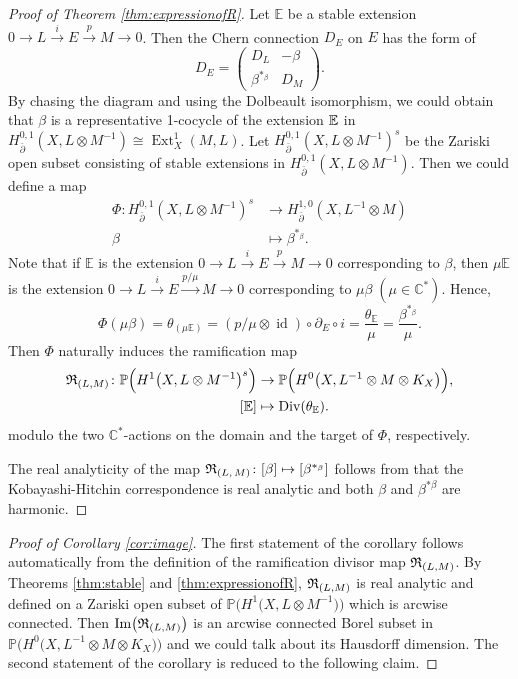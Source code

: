 \documentclass[12pt]{article}
\begin{document}
\begin{proof}[Proof of Theorem \ref{thm:expressionofR}]
Let $\mathbb{E}$ be a stable extension $0 \to L \xrightarrow{i} E \xrightarrow{p}  M \to 0$. Then the Chern connection $D_{E}$ on $E$ has the form of
\[ D_{E} = \begin{pmatrix}
D_{L} &  - \beta \\
  \beta^{*_{\beta}}     &D_{M}
\end{pmatrix}. \]
By chasing the diagram and using the Dolbeault isomorphism, %
we could obtain that $\beta$ is a representative 1-cocycle of the extension ${\Bbb E}$ in $H^{0,1}_{\bar{\partial}}(X, L \otimes M^{-1}) \cong \operatorname{Ext}_{X}^{1}(M, L)$. Let $H_{\bar{\partial}}^{0,1}(X, L \otimes M^{-1})^{s}$ be the Zariski open subset consisting of stable extensions in $H^{0,1}_{\bar{\partial}}(X, L \otimes M^{-1})$. Then we could define a map
\begin{align*}
\Phi \colon H_{\bar{\partial}}^{0,1}(X, L \otimes M^{-1})^{s} &\to H_{\bar{\partial}}^{1,0}(X, L^{-1} \otimes M) \\
  \beta &\mapsto \beta^{*_{\beta}}.
\end{align*}
Note that if $\mathbb{E}$ is the extension $0 \to L \xrightarrow{i} E \xrightarrow{p} M \to 0$ corresponding to $\beta$, then $\mu \mathbb{E}$ is the extension $0 \to L \xrightarrow{i} E \xrightarrow{p/\mu} M \to 0$ corresponding to $\mu \beta \; (\mu \in \mathbb{C}^{*})$. Hence,
\[ \Phi(\mu \beta) = \theta_{(\mu \mathbb E)} = (p/\mu \otimes \operatorname{id}) \circ \partial_{E} \circ i = \frac{\theta_{\mathbb E}}{\mu}  = \frac{\beta^{*_{\beta}}}{\mu}. \]
Then $\Phi$ naturally induces the ramification map
\begin{align*}
{\frak R}_{(L, M)}\colon \mathbb{P}\Big(H^{1}\big(X, L \otimes M^{-1}\big)^{s}\Big) &\rightarrow \mathbb{P}\Big(H^{0}\big(X, L^{-1} \otimes M \otimes K_{X}\big)\Big), \\
[{\Bbb E}] &\mapsto {\rm Div}(\theta_{\Bbb E}).
\end{align*}
modulo the two  $\mathbb C^{*}$-actions on the domain and the target of $\Phi$, respectively.

The real analyticity of the map
${\frak R}_{(L,\, M)}\colon [\beta]\mapsto [\beta^{*_\beta}]$ follows from that the Kobayashi-Hitchin correspondence is real analytic and both $\beta$ and $\beta^{*\beta}$ are harmonic.
\end{proof}

\begin{proof}[Proof of Corollary \ref{cor:image}]
The first statement of the corollary follows automatically from the definition of the ramification divisor map
${\frak R}_{(L,M)}$. By Theorems \ref{thm:stable} and \ref{thm:expressionofR},
${\frak R}_{(L,M)}$ is real analytic and defined on a Zariski open subset of $\mathbb{P}\Big(H^{1}\big(X, L \otimes M^{-1}\big)\Big)$ which is arcwise connected. Then ${\rm Im}\big({\frak R}_{(L,M)}\big)$ is an arcwise connected Borel subset in $\mathbb{P}\Big(H^{0}\big(X, L^{-1} \otimes M \otimes K_{X}\big)\Big)$ and we could talk about its Hausdorff dimension. The second statement of the corollary is reduced to the following claim.
\end{proof}
\end{document}
